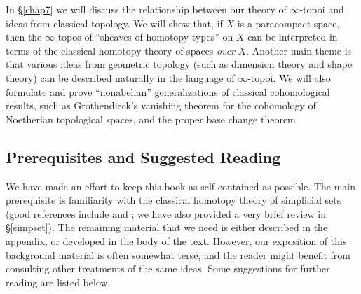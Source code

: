 

In \S \ref{chap7} we will discuss the relationship between our theory of $\infty$-topoi and ideas from classical topology. We will show that, if $X$ is a paracompact space, then the $\infty$-topos of ``sheaves of homotopy types'' on $X$ can be interpreted in terms of the classical homotopy theory of spaces {\em over} $X$. Another main theme is that various ideas from geometric topology (such as dimension theory and shape theory) can be described naturally in the language of $\infty$-topoi. We will also formulate and prove ``nonabelian'' generalizations of classical cohomological results, such as Grothendieck's vanishing theorem for the cohomology of Noetherian topological spaces, and the proper base change theorem.

\subsection*{Prerequisites and Suggested Reading}

We have made an effort to keep this book as self-contained as possible. The main prerequisite is familiarity with the classical homotopy theory of simplicial sets (good references include \cite{maysimp} and \cite{goerssjardine}; we have also provided a very brief review in \S \ref{simpset}). The remaining material that we need is either described in the appendix, or developed in the body of the text. However, our exposition of this background material is often somewhat terse, and the reader might benefit from consulting other treatments of the same ideas. Some suggestions for further reading are listed below.

